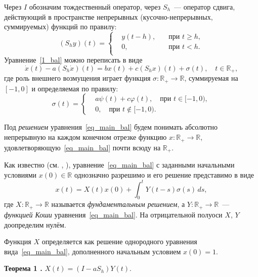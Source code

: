 Через $I$ обозначим тождественный оператор, через $S_h$~--- оператор сдвига, действующий в пространстве непрерывных (кусочно-непрерывных, суммируемых) функций по правилу:
\begin{equation*}
(S_hy)(t)=\left\{
\begin{aligned}
&y(t-h),\quad&\mbox{при }t\ge h,\\
&0,&\mbox{при }t<h.\\
\end{aligned}
\right.
\end{equation*}
Уравнение~\eqref{1_bal} можно переписать в виде
\begin{equation}
\label{eq_main_bal}
\dot x(t)-a(S_h\dot x)(t)=bx(t)+c(S_hx)(t)+\sigma(t),\quad t\in\mathbb R_+,
\end{equation}
где роль внешнего возмущения играет функция $\sigma\colon\mathbb R_+\to\mathbb R$, суммируемая на $[-1,0]$ и
определяемая по правилу:
\begin{equation*}
\sigma(t)=\left\{
\begin{aligned}
&a\psi(t)+c\varphi(t),\quad\mbox{при }t\in[-1,0),\\
&0,\quad\mbox{при }t\notin[-1,0).
\end{aligned}
\right.
\end{equation*}

Под {\it решением} уравнения~\eqref{eq_main_bal} будем понимать абсолютно непрерывную на каждом конечном отрезке функцию $x\colon\mathbb R_+\to\mathbb R$, удовлетворяющую~\eqref{eq_main_bal} почти всюду на $\mathbb R_+$.

Как известно (см. \cite[с. 84, теорема 1.1]{bib_amr_bal}, \cite{bib_BalMal2_bal}), уравнение~\eqref{eq_main_bal} с заданными начальными условиями $x(0)\in\mathbb R$ однозначно разрешимо и его решение представимо в виде
\begin{equation*}
x(t)=X(t)x(0)+\int_0^tY(t-s)\sigma(s)\,ds,
\end{equation*}
где $X\colon\mathbb R_+\to\mathbb R$ называется {\it фундаментальным решением}, а $Y\colon\mathbb R_+\to\mathbb R$~--- {\it функцией Коши} уравнения~\eqref{eq_main_bal}.
На отрицательной полуоси $X$, $Y$ доопределим нулём.

Функция $X$ определяется как решение однородного уравнения вида~\eqref{eq_main_bal},
дополненного начальным условием $x(0)=1$.

{\bf Теорема 1 \cite{bib_BalMal2_bal}.} $X(t)=(I-aS_h)Y(t)$.

